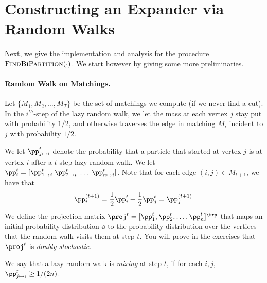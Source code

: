 \section{Constructing an Expander via Random Walks}

Next, we give the implementation and analysis for the procedure $\textsc{FindBiPartition}(\cdot)$. We start however by giving some more preliminaries.

\paragraph{Random Walk on Matchings.} Let $\{M_1, M_2, \dots, M_{T}\}$ be the set of matchings we compute (if we never find a cut). In the $i^{th}$-step of the lazy random walk,  we let the mass at each vertex $j$ stay put with probability $1/2$,  and otherwise traverses the edge in matching $M_i$ incident to $j$ with probability $1/2$. 

We let $\pp_{j \mapsto i}^t$ denote the probability that a particle that started at vertex $j$ is at vertex $i$ after a $t$-step lazy random walk. We let $\pp_i^t = [\pp_{1 \mapsto i}^t\; \pp_{2 \mapsto i}^t\; \dots \;\pp_{n \mapsto i}^t]$. Note that for each edge $(i,j) \in M_{t+1}$, we have that 
\[
\pp_i^{(t+1)} = \frac{1}{2} \pp_i^t + \frac{1}{2} \pp_j^t = \pp_j^{(t+1)}.
\]
We define the projection matrix $\proj^t = [\pp_1^{t}, \pp_2^{t}, \dots, \pp_n^{t}]^\trp$ that maps an initial probability distribution $\dd$ to the probability distribution over the vertices that the random walk visits them at step $t$. You will prove in the exercises that $\proj^t$ is \emph{doubly-stochastic}.

We say that a lazy random walk is \emph{mixing} at step $t$, if for each $i,j$, $\pp_{j \mapsto i}^t \geq 1/(2n)$. 

